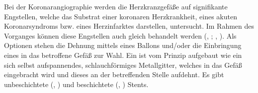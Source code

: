 \begin{description}
  Bei der Koronarangiographie werden die Herzkranzgefäße auf
  signifikante Engstellen, welche das Substrat einer
  koronaren Herzkrankheit, eines akuten Koronarsyndroms bzw.
  eines Herzinfarktes darstellen, untersucht. Im Rahmen des
  Vorganges können diese Engstellen auch gleich behandelt
  werden (, ;
  , ).
  Als Optionen stehen die Dehnung mittels eines Ballons und/oder die Einbringung eines 
  in das betroffene Gefäß zur Wahl. Ein  ist vom
  Prinzip aufgebaut wie ein sich selbst aufspannendes,
  schlauchförmiges Metallgitter, welches in das Gefäß
  eingebracht wird und dieses an der betreffenden Stelle
  aufdehnt. Es gibt unbeschichtete (, ) und beschichtete (, ) Stents.
  

\end{description}

